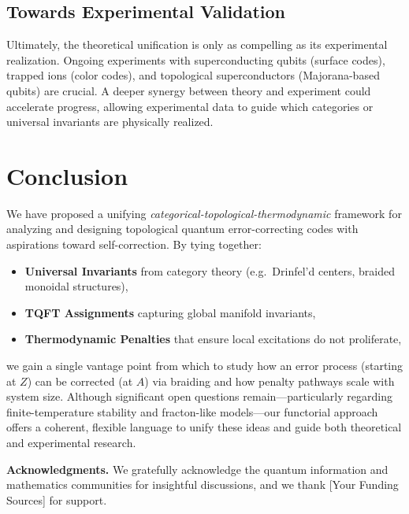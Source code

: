 \documentclass[12pt]{article}
\begin{document}
\subsection{Towards Experimental Validation}
Ultimately, the theoretical unification is only as compelling as its experimental realization. Ongoing experiments with superconducting qubits (surface codes), trapped ions (color codes), and topological superconductors (Majorana-based qubits) are crucial. A deeper synergy between theory and experiment could accelerate progress, allowing experimental data to guide which categories or universal invariants are physically realized.

\section{Conclusion}
We have proposed a unifying \emph{categorical-topological-thermodynamic} framework for analyzing and designing topological quantum error-correcting codes with aspirations toward self-correction. By tying together:
\begin{itemize}
    \item \textbf{Universal Invariants} from category theory (e.g.\ Drinfel’d centers, braided monoidal structures), 
    \item \textbf{TQFT Assignments} capturing global manifold invariants,
    \item \textbf{Thermodynamic Penalties} that ensure local excitations do not proliferate,
\end{itemize}
we gain a single vantage point from which to study how an error process (starting at $Z$) can be corrected (at $A$) via braiding and how penalty pathways scale with system size. Although significant open questions remain—particularly regarding finite-temperature stability and fracton-like models—our functorial approach offers a coherent, flexible language to unify these ideas and guide both theoretical and experimental research.

\vspace{1em}

\noindent \textbf{Acknowledgments.} We gratefully acknowledge the quantum information and mathematics communities for insightful discussions, and we thank [Your Funding Sources] for support. 
\end{document}
